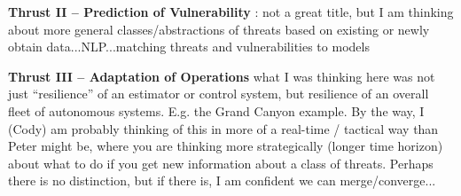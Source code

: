 \documentclass[11pt,letterpaper]{article}
\newcommand{\boldheading}[1]{{\vspace{0.1in}\noindent \bf #1} \hspace{0.06in}}
\begin{document}

\boldheading{Thrust II -- Prediction of Vulnerability}: not a great title, but I am thinking about more general classes/abstractions of threats based on existing or newly obtain data...NLP...matching threats and vulnerabilities to models


\boldheading{Thrust III -- Adaptation of Operations} what I was thinking here was not just ``resilience'' of an estimator or control system, but resilience of an overall fleet of autonomous systems. E.g. the Grand Canyon example. By the way, I (Cody) am probably thinking of this in more of a real-time / tactical way than Peter might be, where you are thinking more strategically (longer time horizon) about what to do if you get new information about a class of threats. Perhaps there is no distinction, but if there is, I am confident we can merge/converge...
\end{document}
